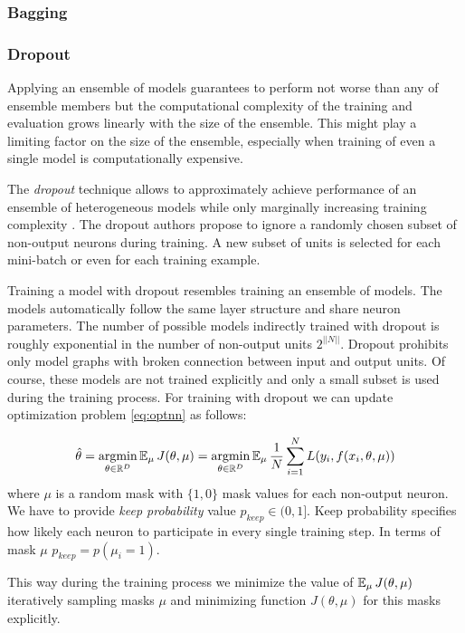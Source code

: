 \subsubsection{Bagging}
\subsubsection{Dropout}

Applying an ensemble of models guarantees to perform not worse than any of ensemble members but the computational complexity of the training and evaluation grows linearly with the size of the ensemble. This might play a limiting factor on the size of the ensemble, especially when training of even a single model is computationally expensive.

The \textit{dropout} technique allows to approximately achieve performance of an ensemble of heterogeneous models while only marginally increasing training complexity \cite{Srivastava2014}.
The dropout authors propose to ignore a randomly chosen subset of non-output neurons during training. A new subset of units is selected for each mini-batch or even for each training example.

Training a model with dropout resembles training an ensemble of models. The models automatically follow the same layer structure and share neuron parameters. The number of possible models indirectly trained with dropout is roughly exponential in the number of non-output units $2^{||N||}$. Dropout prohibits only model graphs with broken connection between input and output units. Of course, these models are not trained explicitly and only a small subset is used during the training process. For training with dropout we can update optimization problem \ref{eq:optnn} as follows:

\begin{equation}\label{eq:optnndo}
  \hat{\theta} = \operatorname*{argmin}_{\theta \in \Bbb{R}^D} \operatorname{\mathbb{E}}_\mu J(\theta, \mu) = \operatorname*{argmin}_{\theta \in \Bbb{R}^D} \operatorname{\mathbb{E}}_\mu \frac{1}{N} \sum_{i=1}^{N} L(y_i, f(x_i, \theta, \mu))
\end{equation}
where $\mu$ is a random mask with $\{1, 0\}$ mask values for each non-output neuron. We have to provide \textit{keep probability} value $p_{keep} \in (0, 1]$. Keep probability specifies how likely each neuron to participate in every single training step. In terms of mask $\mu$ $p_{keep}=p(\mu_i = 1)$.

This way during the training process we minimize the value of $\operatorname{\mathbb{E}}_\mu J(\theta, \mu)$ iteratively sampling masks $\mu$ and minimizing function $J(\theta, \mu)$ for this masks explicitly.


